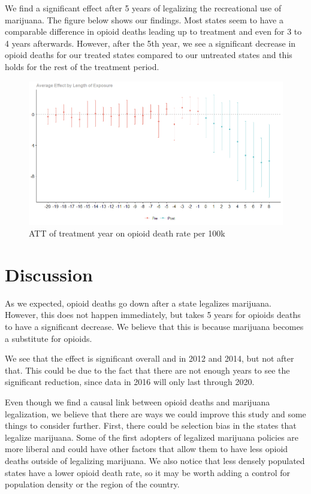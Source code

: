 \documentclass{article}
\begin{document}
We find a significant effect after 5 years of legalizing the recreational use of marijuana. The figure below shows our findings. Most states seem to have a comparable difference in opioid deaths leading up to treatment and even for 3 to 4 years afterwards. However, after the 5th year, we see a significant decrease in opioid deaths for our treated states compared to our untreated states and this holds for the rest of the treatment period. 


\begin{figure}
    \begin{center}
        \includegraphics[width=.85\textwidth]{sc_graph.png}
    \end{center}
    \caption{ATT of treatment year on opioid death rate per 100k}
    \label{fig:graph}
\end{figure}





\section*{Discussion}

As we expected, opioid deaths go down after a state legalizes marijuana. However, this does not happen immediately, but takes 5 years for opioids deaths to have a significant decrease. We believe that this is because marijuana becomes a substitute for opioids. 

We see that the effect is significant overall and in 2012 and 2014, but not after that. This could be due to the fact that there are not enough years to see the significant reduction, since data in 2016 will only last through 2020. 

Even though we find a causal link between opioid deaths and marijuana legalization, we believe that there are ways we could improve this study and some things to consider further. First, there could be selection bias in the states that legalize marijuana. Some of the first adopters of legalized marijuana policies are more liberal and could have other factors that allow them to have less opioid deaths outside of legalizing marijuana. We also notice that less densely populated states have a lower opioid death rate, so it may be worth adding a control for population density or the region of the country.
\end{document}
